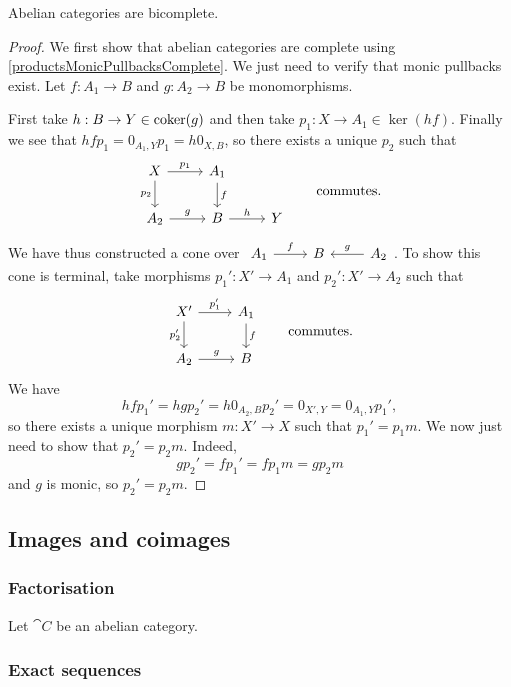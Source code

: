 \begin{proposition}
Abelian categories are bicomplete.
\end{proposition}
\begin{proof}
We first show that abelian categories are complete using \ref{productsMonicPullbacksComplete}. We just need to verify that monic pullbacks exist. Let $f: A_1\to B$ and $g: A_2\to B$ be monomorphisms.

First take $h: B\to Y\in \operatorname{coker}(g)$ and then take $p_1: X\to A_1 \in \ker(hf)$. Finally we see that $hfp_1 = 0_{A_1, Y}p_1 = h0_{X,B}$, so there exists a unique $p_2$ such that
\[ \begin{tikzcd}
X \arrow[r, "{p_1}"] \arrow[d, swap, "{p_2}"] & A_1 \arrow[d, "f"] & \\
A_2 \arrow[r, "g"] & B \arrow[r, "h"] & Y
\end{tikzcd} \qquad\text{commutes.} \]
We have thus constructed a cone over $\begin{tikzcd}
A_1 \arrow[r, "f"] & B & \arrow[l, swap, "g"] A_2
\end{tikzcd}$. To show this cone is terminal, take morphisms $p_1': X'\to A_1$ and $p_2': X'\to A_2$ such that
\[ \begin{tikzcd}
X' \arrow[r, "{p_1'}"] \arrow[d, swap, "{p_2'}"] & A_1 \arrow[d, "f"] \\
A_2 \arrow[r, "g"] & B
\end{tikzcd}\qquad \text{commutes.} \]
We have
\[ hfp_1' = hgp_2' = h0_{A_2, B}p_2' = 0_{X',Y} = 0_{A_1, Y}p_1', \]
so there exists a unique morphism $m:X'\to X$ such that $p_1' = p_1m$. We now just need to show that $p_2' = p_2m$. Indeed,
\[ gp_2' = fp_1' = fp_1m = gp_2m \]
and $g$ is monic, so $p_2' = p_2m$.
\end{proof}

\subsection{Images and coimages}
\subsubsection{Factorisation}
\begin{proposition}
Let $\cat{C}$ be an abelian category.
\end{proposition}

\subsubsection{Exact sequences}
